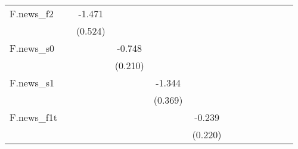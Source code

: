{\begin{tabular}{l*{12}{c}}
\addlinespace
F.news\_f2   &                     &      -1.471\sym{***}&                     &                     &                     &                     &                     &                     &                     &                     &                     &                     \\
            &                     &     (0.524)         &                     &                     &                     &                     &                     &                     &                     &                     &                     &                     \\
\addlinespace
F.news\_s0   &                     &                     &      -0.748\sym{***}&                     &                     &                     &                     &                     &                     &                     &                     &                     \\
            &                     &                     &     (0.210)         &                     &                     &                     &                     &                     &                     &                     &                     &                     \\
\addlinespace
F.news\_s1   &                     &                     &                     &      -1.344\sym{***}&                     &                     &                     &                     &                     &                     &                     &                     \\
            &                     &                     &                     &     (0.369)         &                     &                     &                     &                     &                     &                     &                     &                     \\
\addlinespace
F.news\_f1t  &                     &                     &                     &                     &      -0.239         &                     &                     &                     &                     &                     &                     &                     \\
            &                     &                     &                     &                     &     (0.220)         &                     &                     &                     &                     &                     &                     &                     \\

\end{tabular}}
